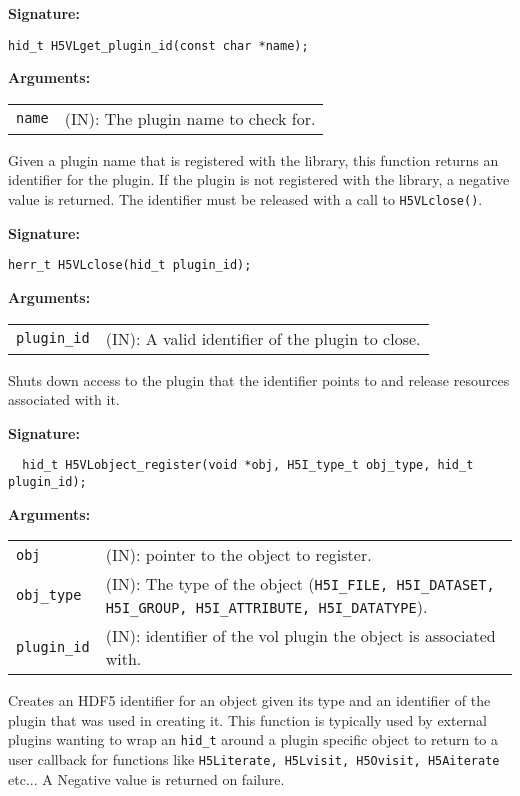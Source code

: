 \begin{mdframed}[style=bgbox]
\textbf{Signature:}
\begin{lstlisting}
hid_t H5VLget_plugin_id(const char *name);
\end{lstlisting}
\textbf{Arguments:}\\
\begin{tabular}{l p{13.5cm}}
  {\tt name} & (IN): The plugin name to check for.\\
\end{tabular}
\end{mdframed}
Given a plugin name that is registered with the library, this function returns an identifier for the plugin. If the plugin is not registered with the library, a negative value is returned. The identifier must be released with a call to {\tt H5VLclose()}.\bigskip


\begin{mdframed}[style=bgbox]
\textbf{Signature:}
\begin{lstlisting}
herr_t H5VLclose(hid_t plugin_id);
\end{lstlisting}

\textbf{Arguments:}\\
\begin{tabular}{l p{13.5cm}}
 {\tt plugin\_id} & (IN): A valid identifier of the plugin to close.\\
\end{tabular}
\end{mdframed}
Shuts down access to the plugin that the identifier points to and release resources associated with it.\bigskip


\begin{mdframed}[style=bgbox]
\textbf{Signature:}
\begin{lstlisting}
  hid_t H5VLobject_register(void *obj, H5I_type_t obj_type, hid_t plugin_id);
\end{lstlisting}

\textbf{Arguments:}\\
\begin{tabular}{l p{13.5cm}}
 {\tt obj} & (IN): pointer to the object to register.\\
 {\tt obj\_type} & (IN): The type of the object ({\tt H5I\_FILE, H5I\_DATASET, H5I\_GROUP, H5I\_ATTRIBUTE, H5I\_DATATYPE}).\\
 {\tt plugin\_id} & (IN): identifier of the vol plugin the object is associated with.\\
\end{tabular}
\end{mdframed}
Creates an HDF5 identifier for an object given its type and an identifier of the plugin that was used in creating it. This function is typically used by external plugins wanting to wrap an {\tt hid\_t} around a plugin specific object to return to a user callback for functions like {\tt H5Literate, H5Lvisit, H5Ovisit, H5Aiterate} etc... A Negative value is returned on failure.\bigskip

